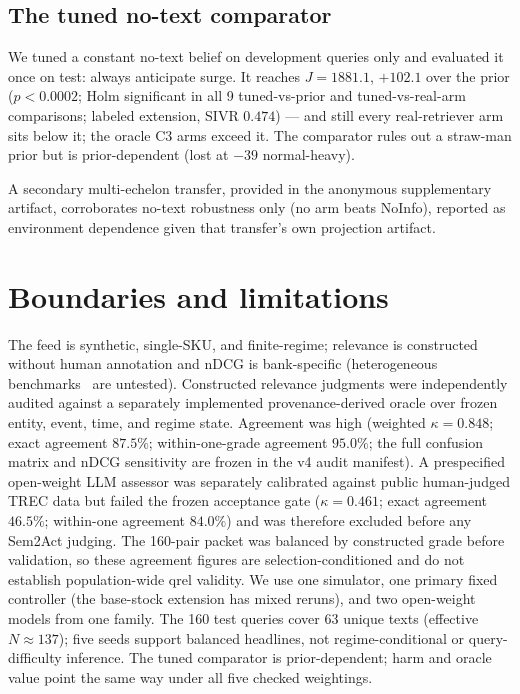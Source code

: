 \documentclass[a4paper,runningheads]{llncs}
\begin{document}
\subsection{The tuned no-text comparator}
\label{sec:tuned}

We tuned a constant no-text
belief on development queries only and evaluated it
once on test: always anticipate surge.
It reaches $J=1881.1$, $+102.1$ over the prior ($p<0.0002$; Holm
significant in all 9 tuned-vs-prior and tuned-vs-real-arm comparisons;
labeled extension, SIVR $0.474$) ---
and still every real-retriever arm sits below it; the oracle C3 arms exceed
it. The
comparator rules out a straw-man prior but is prior-dependent (lost at
$-39$ normal-heavy).

A secondary multi-echelon transfer, provided in the anonymous
supplementary artifact, corroborates no-text
robustness only
(no arm beats NoInfo), reported as
environment dependence given that transfer's own projection artifact.

\section{Boundaries and limitations}
\label{sec:limitations}

The feed is synthetic, single-SKU, and finite-regime; relevance is constructed
without human annotation and nDCG is bank-specific
(heterogeneous benchmarks~\cite{thakur2021beir} are untested). Constructed
relevance judgments were independently audited against a separately
implemented provenance-derived oracle over frozen entity, event, time, and
regime state. Agreement was high (weighted $\kappa=0.848$; exact agreement
$87.5\%$; within-one-grade agreement $95.0\%$; the full confusion matrix and
nDCG sensitivity are frozen in the v4 audit manifest).
A prespecified open-weight LLM assessor was separately calibrated against
public human-judged TREC data but failed the frozen acceptance gate
($\kappa=0.461$; exact agreement $46.5\%$; within-one agreement $84.0\%$)
and was therefore excluded before any Sem2Act judging. The 160-pair packet
was balanced by constructed grade before validation, so these agreement
figures are selection-conditioned and do not establish population-wide qrel
validity.
We use one simulator, one primary fixed controller (the base-stock extension
has mixed reruns), and two open-weight models from one family. The 160 test
queries cover 63 unique texts (effective $N\approx137$); five seeds support
balanced headlines, not regime-conditional or query-difficulty inference.
The tuned comparator is prior-dependent; harm and
oracle value point the same way under all five checked weightings.
\end{document}
